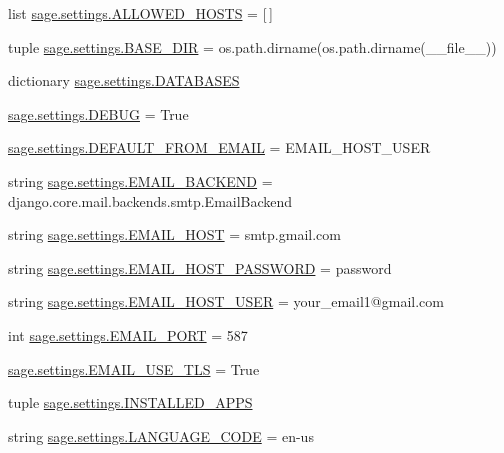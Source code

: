 \begin{DoxyCompactItemize}
\item 
list \hyperlink{a00043_a2eb98def792cf73bbc5884024afc5602}{sage.\+settings.\+A\+L\+L\+O\+W\+E\+D\+\_\+\+H\+O\+S\+T\+S} = \mbox{[}$\,$\mbox{]}
\item 
tuple \hyperlink{a00043_add6d83672b1137d74a06bf1606aecf04}{sage.\+settings.\+B\+A\+S\+E\+\_\+\+D\+I\+R} = os.\+path.\+dirname(os.\+path.\+dirname(\+\_\+\+\_\+file\+\_\+\+\_\+))
\item 
dictionary \hyperlink{a00043_a870c10acdd1141ac92340ce3e50ffbbd}{sage.\+settings.\+D\+A\+T\+A\+B\+A\+S\+E\+S}
\item 
\hyperlink{a00043_acc28086c56df6aed910b2552e07944cc}{sage.\+settings.\+D\+E\+B\+U\+G} = True
\item 
\hyperlink{a00043_a6517c4f93850d63e2bdbe7040ad0e2ff}{sage.\+settings.\+D\+E\+F\+A\+U\+L\+T\+\_\+\+F\+R\+O\+M\+\_\+\+E\+M\+A\+I\+L} = E\+M\+A\+I\+L\+\_\+\+H\+O\+S\+T\+\_\+\+U\+S\+E\+R
\item 
string \hyperlink{a00043_a2d83ca0a279480aa03599465a0386b17}{sage.\+settings.\+E\+M\+A\+I\+L\+\_\+\+B\+A\+C\+K\+E\+N\+D} = \textquotesingle{}django.\+core.\+mail.\+backends.\+smtp.\+Email\+Backend\textquotesingle{}
\item 
string \hyperlink{a00043_a594329fe15c9680f523afaab779411ed}{sage.\+settings.\+E\+M\+A\+I\+L\+\_\+\+H\+O\+S\+T} = \textquotesingle{}smtp.\+gmail.\+com\textquotesingle{}
\item 
string \hyperlink{a00043_a66e7a16ed6b0df5716a6579fcba949a6}{sage.\+settings.\+E\+M\+A\+I\+L\+\_\+\+H\+O\+S\+T\+\_\+\+P\+A\+S\+S\+W\+O\+R\+D} = \textquotesingle{}password\textquotesingle{}
\item 
string \hyperlink{a00043_a9c01855359753a3c3f517341806347c2}{sage.\+settings.\+E\+M\+A\+I\+L\+\_\+\+H\+O\+S\+T\+\_\+\+U\+S\+E\+R} = \textquotesingle{}your\+\_\+email1@gmail.\+com\textquotesingle{}
\item 
int \hyperlink{a00043_a3fe927460bba6408b5df39fa8a10d367}{sage.\+settings.\+E\+M\+A\+I\+L\+\_\+\+P\+O\+R\+T} = 587
\item 
\hyperlink{a00043_a0fe7c4174cb1b7d03f7b574ae1e5eed9}{sage.\+settings.\+E\+M\+A\+I\+L\+\_\+\+U\+S\+E\+\_\+\+T\+L\+S} = True
\item 
tuple \hyperlink{a00043_af48e999a4a4e7f8830d84ac4eb08df1a}{sage.\+settings.\+I\+N\+S\+T\+A\+L\+L\+E\+D\+\_\+\+A\+P\+P\+S}
\item 
string \hyperlink{a00043_ac5b7a49ef37a25508ecb84453063821a}{sage.\+settings.\+L\+A\+N\+G\+U\+A\+G\+E\+\_\+\+C\+O\+D\+E} = \textquotesingle{}en-\/us\textquotesingle{}

\end{DoxyCompactItemize}

